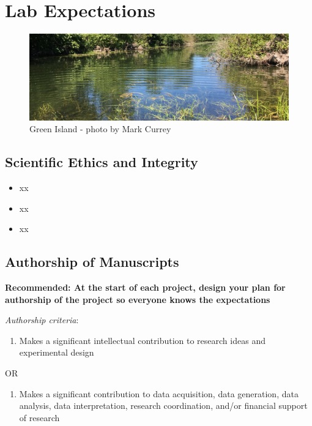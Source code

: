 \documentclass[
]{book}
\providecommand{\tightlist}{%
  \setlength{\itemsep}{0pt}\setlength{\parskip}{0pt}}
\begin{document}
\hypertarget{lab-expectations}{%
\chapter{Lab Expectations}\label{lab-expectations}}

\begin{figure}
\centering
\includegraphics{images/green_island_header.jpg}
\caption{Green Island - photo by Mark Currey}
\end{figure}

\hypertarget{scientific-ethics-and-integrity}{%
\section{Scientific Ethics and Integrity}\label{scientific-ethics-and-integrity}}

\begin{itemize}
\tightlist
\item
  xx
\item
  xx
\item
  xx
\end{itemize}

\hypertarget{authorship-of-manuscripts}{%
\section{Authorship of Manuscripts}\label{authorship-of-manuscripts}}

\textbf{Recommended: At the start of each project, design your plan for authorship of the project so
everyone knows the expectations}

\emph{Authorship criteria}:

\begin{enumerate}
\def\labelenumi{\arabic{enumi})}
\tightlist
\item
  Makes a significant intellectual contribution to research ideas and experimental design
\end{enumerate}

OR

\begin{enumerate}
\def\labelenumi{\arabic{enumi})}
\setcounter{enumi}{1}
\tightlist
\item
  Makes a significant contribution to data acquisition, data generation, data analysis, data
  interpretation, research coordination, and/or financial support of research
\end{enumerate}
\end{document}
